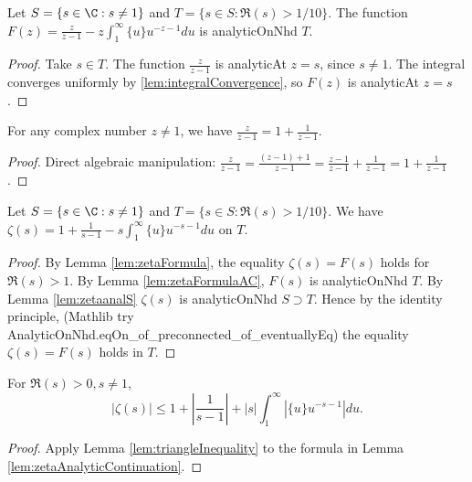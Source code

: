 \begin{lemma}\label{lem:zetaFormulaAC}
\leanok
Let $S=\{s\in \C : s\neq 1\}$ and $T=\{s\in S : \Re(s)>1/10\}$. The function $F(z) = \frac{z}{z-1} - z \int_1^\infty \{u\} u^{-z-1} du$ is analyticOnNhd $T$.
\end{lemma}
\begin{proof}
\leanok
Take $s\in T$. The function $\frac{z}{z-1}$ is analyticAt $z=s$, since $s\neq 1$. The integral converges uniformly by \cref{lem:integralConvergence}, so $F(z)$ is analyticAt $z=s$.
\end{proof}

\begin{lemma}\label{lem:div_eq_one_plus_one_div}
\leanok
For any complex number $z \neq 1$, we have $\frac{z}{z-1} = 1 + \frac{1}{z-1}$.
\end{lemma}
\begin{proof}
\leanok
Direct algebraic manipulation: $\frac{z}{z-1} = \frac{(z-1)+1}{z-1} = \frac{z-1}{z-1} + \frac{1}{z-1} = 1 + \frac{1}{z-1}$.
\end{proof}

\begin{lemma}\label{lem:zetaAnalyticContinuation}
\leanok
Let $S=\{s\in \C : s\neq 1\}$ and $T=\{s\in S : \Re(s)>1/10\}$. We have $\zeta(s) = 1+\frac{1}{s-1} - s \int_1^\infty \{u\} u^{-s-1} du$ on $T$.
\end{lemma}
\begin{proof}
\leanok
By Lemma \ref{lem:zetaFormula}, the equality $\zeta(s)=F(s)$ holds for $\Re(s)>1$. By Lemma \ref{lem:zetaFormulaAC}, $F(s)$ is analyticOnNhd $T$. By Lemma \ref{lem:zetaanalS} $\zeta(s)$ is analyticOnNhd $S\supset T$.
Hence by the identity principle, (Mathlib try AnalyticOnNhd.eqOn\_of\_preconnected\_of\_eventuallyEq)
the equality $\zeta(s)=F(s)$ holds in $T$.
\end{proof}


\begin{lemma}\label{lem:zetaBound1}
\leanok
For $\Re(s)>0, s\neq 1$,
\[ |\zeta(s)| \le 1+\left|\frac{1}{s-1}\right| + |s| \int_1^\infty |\{u\} u^{-s-1}| du. \]
\end{lemma}
\begin{proof} \leanok
{}
Apply Lemma \ref{lem:triangleInequality} to the formula in Lemma \ref{lem:zetaAnalyticContinuation}.
\end{proof}

